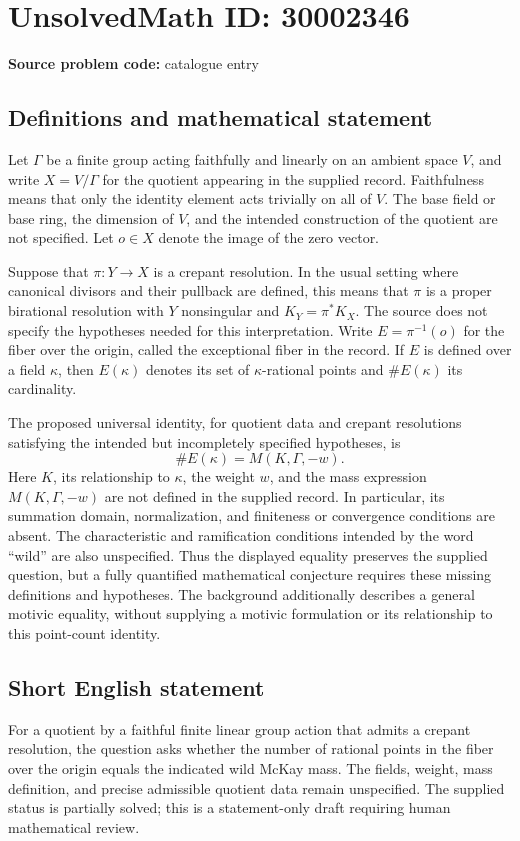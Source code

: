 \documentclass[11pt]{article}
\begin{document}
\section*{UnsolvedMath ID: 30002346}
\textbf{Source problem code:} catalogue entry
\subsection{Definitions and mathematical statement}
Let \(\Gamma\) be a finite group acting faithfully and linearly on an ambient space \(V\), and write \(X=V/\Gamma\) for the quotient appearing in the supplied record. Faithfulness means that only the identity element acts trivially on all of \(V\). The base field or base ring, the dimension of \(V\), and the intended construction of the quotient are not specified. Let \(o\in X\) denote the image of the zero vector.

Suppose that \(\pi:Y\to X\) is a crepant resolution. In the usual setting where canonical divisors and their pullback are defined, this means that \(\pi\) is a proper birational resolution with \(Y\) nonsingular and \(K_Y=\pi^*K_X\). The source does not specify the hypotheses needed for this interpretation. Write \(E=\pi^{-1}(o)\) for the fiber over the origin, called the exceptional fiber in the record. If \(E\) is defined over a field \(\kappa\), then \(E(\kappa)\) denotes its set of \(\kappa\)-rational points and \(\#E(\kappa)\) its cardinality.

The proposed universal identity, for quotient data and crepant resolutions satisfying the intended but incompletely specified hypotheses, is
\[
\#E(\kappa)=M(K,\Gamma,-w).
\]
Here \(K\), its relationship to \(\kappa\), the weight \(w\), and the mass expression \(M(K,\Gamma,-w)\) are not defined in the supplied record. In particular, its summation domain, normalization, and finiteness or convergence conditions are absent. The characteristic and ramification conditions intended by the word ``wild'' are also unspecified. Thus the displayed equality preserves the supplied question, but a fully quantified mathematical conjecture requires these missing definitions and hypotheses. The background additionally describes a general motivic equality, without supplying a motivic formulation or its relationship to this point-count identity.
\subsection{Short English statement}
For a quotient by a faithful finite linear group action that admits a crepant resolution, the question asks whether the number of rational points in the fiber over the origin equals the indicated wild McKay mass. The fields, weight, mass definition, and precise admissible quotient data remain unspecified. The supplied status is partially solved; this is a statement-only draft requiring human mathematical review.
\end{document}
